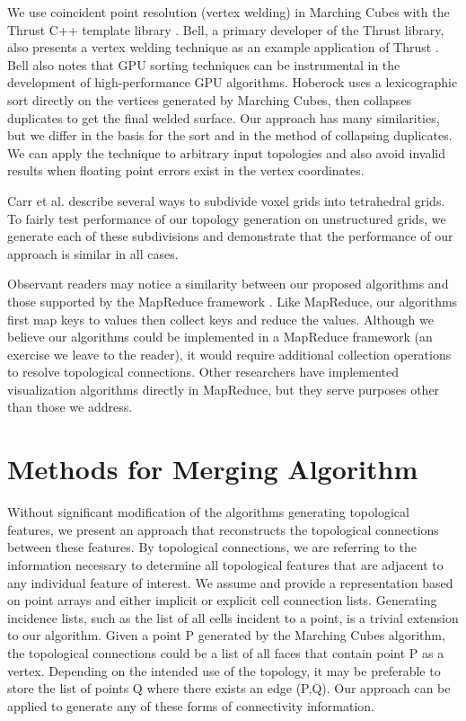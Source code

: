 \documentclass[journal]{vgtc}                %
\begin{document}
We use coincident point resolution (vertex welding) in Marching Cubes with the Thrust
C++ template library \cite{Bell2012}. Bell, a primary
developer of the Thrust library, also presents a vertex welding technique as an
example application of Thrust \cite{Bell2010}. Bell also notes that GPU sorting techniques can
be instrumental in the development of high-performance GPU algorithms. Hoberock uses a
lexicographic sort directly on the vertices generated by Marching Cubes, then collapses 
duplicates to get the final welded surface. Our approach has many similarities, but we
differ in the basis for the sort and in the method of collapsing duplicates. We
can apply the technique to arbitrary input topologies and also avoid invalid results when
floating point errors exist in the vertex coordinates.

Carr et al. \cite{Carr2006} describe several ways to subdivide voxel grids into tetrahedral grids. To fairly test performance of our topology generation on unstructured grids, we generate each of these subdivisions and demonstrate that the performance of our approach is similar in all cases.

Observant readers may notice a similarity between our proposed algorithms and those supported by the MapReduce framework \cite{MapReduce}. Like MapReduce, our algorithms first map keys to values then collect keys and reduce the values. Although we believe our algorithms could be implemented in a MapReduce framework (an exercise we leave to the reader), it would require additional collection operations to resolve topological connections. Other researchers 
\cite{Stuart2010}\cite{Vo2011} have implemented visualization algorithms directly in MapReduce, but they serve purposes other than those we address.

\section{Methods for Merging Algorithm}
Without significant modification of the algorithms generating topological features,
we present an approach that reconstructs the topological connections
between these features. By topological connections, we are referring to the information necessary to
determine all topological features that are adjacent to any individual feature of 
interest. We assume and provide a representation based on point arrays and either implicit or explicit cell connection lists. Generating incidence lists, such as the list of all cells incident to a point, is a trivial extension to our algorithm. Given a point P 
generated by the Marching Cubes algorithm, the topological connections
could be a list of all faces that contain point P as a vertex. Depending on
the intended use of the topology, it may be preferable to store the list of
points Q where there exists an edge (P,Q). Our approach can be applied
to generate any of these forms of connectivity information.
\end{document}
